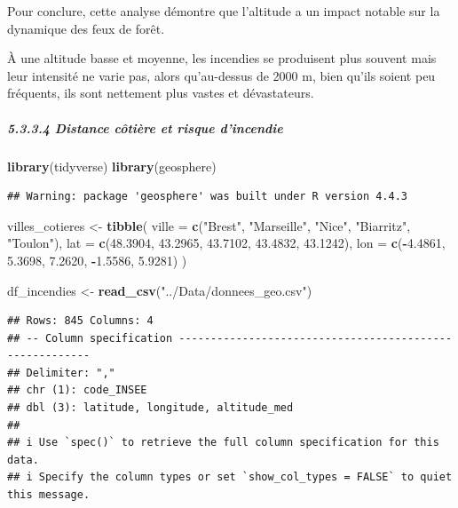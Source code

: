 \documentclass[
]{article}
\newenvironment{Shaded}{\begin{snugshade}}{\end{snugshade}}
\newcommand{\AttributeTok}[1]{\textcolor[rgb]{0.13,0.29,0.53}{#1}}
\newcommand{\FloatTok}[1]{\textcolor[rgb]{0.00,0.00,0.81}{#1}}
\newcommand{\FunctionTok}[1]{\textcolor[rgb]{0.13,0.29,0.53}{\textbf{#1}}}
\newcommand{\NormalTok}[1]{#1}
\newcommand{\OtherTok}[1]{\textcolor[rgb]{0.56,0.35,0.01}{#1}}
\newcommand{\SpecialCharTok}[1]{\textcolor[rgb]{0.81,0.36,0.00}{\textbf{#1}}}
\newcommand{\StringTok}[1]{\textcolor[rgb]{0.31,0.60,0.02}{#1}}
\begin{document}
Pour conclure, cette analyse démontre que l'altitude a un impact notable
sur la dynamique des feux de forêt.

À une altitude basse et moyenne, les incendies se produisent plus
souvent mais leur intensité ne varie pas, alors qu'au-dessus de 2000 m,
bien qu'ils soient peu fréquents, ils sont nettement plus vastes et
dévastateurs.

\subparagraph{5.3.3.4 Distance côtière et risque
d'incendie}\label{distance-cuxf4tiuxe8re-et-risque-dincendie}

\begin{Shaded}
\begin{Highlighting}[]
\FunctionTok{library}\NormalTok{(tidyverse)}
\FunctionTok{library}\NormalTok{(geosphere)}
\end{Highlighting}
\end{Shaded}

\begin{verbatim}
## Warning: package 'geosphere' was built under R version 4.4.3
\end{verbatim}

\begin{Shaded}
\begin{Highlighting}[]
\NormalTok{villes\_cotieres }\OtherTok{\textless{}{-}} \FunctionTok{tibble}\NormalTok{(}
  \AttributeTok{ville =} \FunctionTok{c}\NormalTok{(}\StringTok{"Brest"}\NormalTok{, }\StringTok{"Marseille"}\NormalTok{, }\StringTok{"Nice"}\NormalTok{, }\StringTok{"Biarritz"}\NormalTok{, }\StringTok{"Toulon"}\NormalTok{),}
  \AttributeTok{lat =} \FunctionTok{c}\NormalTok{(}\FloatTok{48.3904}\NormalTok{, }\FloatTok{43.2965}\NormalTok{, }\FloatTok{43.7102}\NormalTok{, }\FloatTok{43.4832}\NormalTok{, }\FloatTok{43.1242}\NormalTok{),}
  \AttributeTok{lon =} \FunctionTok{c}\NormalTok{(}\SpecialCharTok{{-}}\FloatTok{4.4861}\NormalTok{, }\FloatTok{5.3698}\NormalTok{, }\FloatTok{7.2620}\NormalTok{, }\SpecialCharTok{{-}}\FloatTok{1.5586}\NormalTok{, }\FloatTok{5.9281}\NormalTok{)}
\NormalTok{)}

\NormalTok{df\_incendies }\OtherTok{\textless{}{-}} \FunctionTok{read\_csv}\NormalTok{(}\StringTok{"../Data/donnees\_geo.csv"}\NormalTok{)}
\end{Highlighting}
\end{Shaded}

\begin{verbatim}
## Rows: 845 Columns: 4
## -- Column specification --------------------------------------------------------
## Delimiter: ","
## chr (1): code_INSEE
## dbl (3): latitude, longitude, altitude_med
## 
## i Use `spec()` to retrieve the full column specification for this data.
## i Specify the column types or set `show_col_types = FALSE` to quiet this message.
\end{verbatim}
\end{document}
